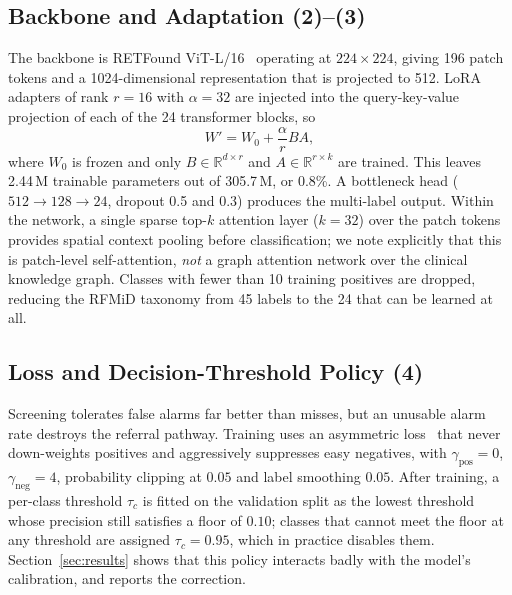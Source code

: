 \documentclass[11pt]{IEEEtran}
\begin{document}
\subsection{Backbone and Adaptation (2)--(3)}
The backbone is RETFound ViT-L/16~\cite{retfound2023} operating at $224\times224$, giving 196
patch tokens and a 1024-dimensional representation that is projected to 512. LoRA adapters of
rank $r{=}16$ with $\alpha{=}32$ are injected into the query-key-value projection of each of the
24 transformer blocks, so
\begin{equation}
W' = W_0 + \frac{\alpha}{r} BA ,
\end{equation}
where $W_0$ is frozen and only $B \in \mathbb{R}^{d \times r}$ and $A \in \mathbb{R}^{r \times k}$
are trained. This leaves 2.44\,M trainable parameters out of 305.7\,M, or 0.8\%. A bottleneck head
($512 \rightarrow 128 \rightarrow 24$, dropout 0.5 and 0.3) produces the multi-label output.
Within the network, a single sparse top-$k$ attention layer ($k{=}32$) over the patch tokens
provides spatial context pooling before classification; we note explicitly that this is
patch-level self-attention, \emph{not} a graph attention network over the clinical knowledge
graph. Classes with fewer than 10 training positives are dropped, reducing the RFMiD taxonomy
from 45 labels to the 24 that can be learned at all.

\subsection{Loss and Decision-Threshold Policy (4)}
Screening tolerates false alarms far better than misses, but an unusable alarm rate destroys the
referral pathway. Training uses an asymmetric loss~\cite{asl2021} that never down-weights
positives and aggressively suppresses easy negatives, with $\gamma_{\text{pos}}{=}0$,
$\gamma_{\text{neg}}{=}4$, probability clipping at $0.05$ and label smoothing $0.05$. After
training, a per-class threshold $\tau_c$ is fitted on the validation split as the lowest threshold
whose precision still satisfies a floor of $0.10$; classes that cannot meet the floor at any
threshold are assigned $\tau_c{=}0.95$, which in practice disables them. Section~\ref{sec:results}
shows that this policy interacts badly with the model's calibration, and reports the correction.
\end{document}
